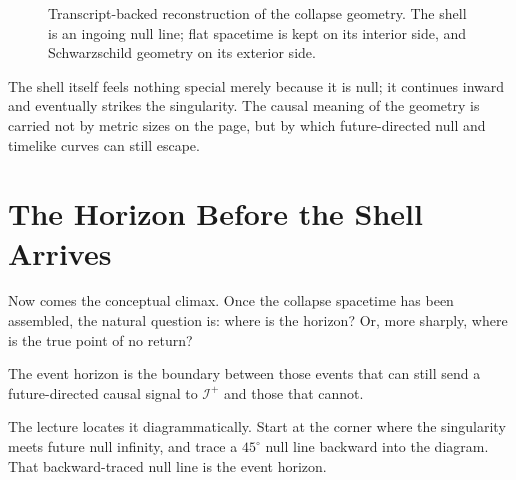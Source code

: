 \begin{figure}[htbp]
\centering
{}
\caption{Transcript-backed reconstruction of the collapse geometry. The shell is an ingoing null line; flat spacetime is kept on its interior side, and Schwarzschild geometry on its exterior side.}
\end{figure}

The shell itself feels nothing special merely because it is null; it continues inward and eventually strikes the singularity. The causal meaning of the geometry is carried not by metric sizes on the page, but by which future-directed null and timelike curves can still escape.

\section{The Horizon Before the Shell Arrives}

Now comes the conceptual climax. Once the collapse spacetime has been assembled, the natural question is: where is the horizon? Or, more sharply, where is the true point of no return?

\begin{definition}
The event horizon is the boundary between those events that can still send a future-directed causal signal to \(\mathscr I^+\) and those that cannot.
\end{definition}

The lecture locates it diagrammatically. Start at the corner where the singularity meets future null infinity, and trace a \(45^\circ\) null line backward into the diagram. That backward-traced null line is the event horizon.

